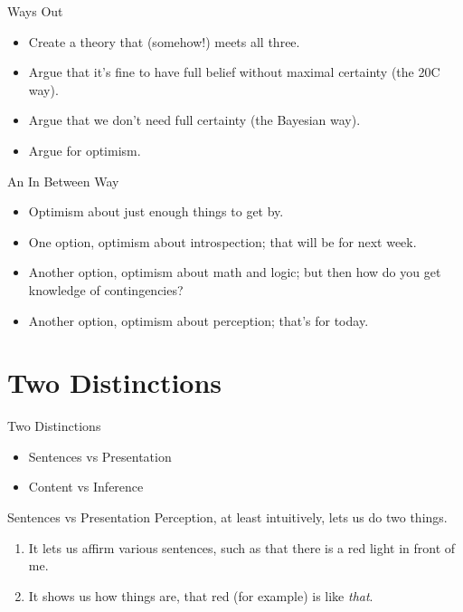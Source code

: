 \documentclass[
  17pt,
  letterpaper,
  ignorenonframetext,
  aspectratio=169,
]{beamer}
\providecommand{\tightlist}{%
  \setlength{\itemsep}{0pt}\setlength{\parskip}{0pt}}\usepackage{longtable,booktabs,array}
\begin{document}
\begin{frame}{Ways Out}
\protect\hypertarget{ways-out}{}
\begin{itemize}[<+->]
\tightlist
\item
  Create a theory that (somehow!) meets all three.
\item
  Argue that it's fine to have full belief without maximal certainty
  (the 20C way).
\item
  Argue that we don't need full certainty (the Bayesian way).
\item
  Argue for optimism.
\end{itemize}
\end{frame}

\begin{frame}{An In Between Way}
\protect\hypertarget{an-in-between-way}{}
\begin{itemize}[<+->]
\tightlist
\item
  Optimism about just enough things to get by.
\item
  One option, optimism about introspection; that will be for next week.
\item
  Another option, optimism about math and logic; but then how do you get
  knowledge of contingencies?
\item
  Another option, optimism about perception; that's for today.
\end{itemize}
\end{frame}

\hypertarget{two-distinctions}{%
\section{Two Distinctions}\label{two-distinctions}}

\begin{frame}{Two Distinctions}
\protect\hypertarget{two-distinctions-1}{}
\begin{itemize}[<+->]
\tightlist
\item
  Sentences vs Presentation
\item
  Content vs Inference
\end{itemize}
\end{frame}

\begin{frame}{Sentences vs Presentation}
\protect\hypertarget{sentences-vs-presentation}{}
Perception, at least intuitively, lets us do two things.

\begin{enumerate}[<+->]
\tightlist
\item
  It lets us affirm various sentences, such as that there is a red light
  in front of me.
\item
  It shows us how things are, that red (for example) is like
  \emph{that}.
\end{enumerate}
\end{frame}
\end{document}
